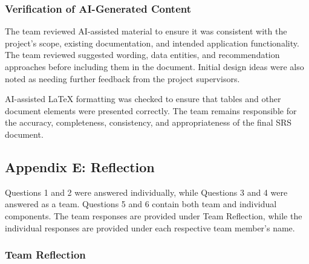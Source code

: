 \documentclass[12pt]{article}
\begin{document}
\subsubsection*{Verification of AI-Generated Content}

The team reviewed AI-assisted material to ensure it was
consistent with the project's scope, existing documentation,
and intended application functionality. The team reviewed suggested 
wording, data entities, and recommendation approaches before including 
them in the document. Initial design ideas were also noted as needing 
further feedback from the project supervisors.

AI-assisted \LaTeX{} formatting was checked to ensure
that tables and other document elements were presented
correctly. The team remains responsible for the accuracy,
completeness, consistency, and appropriateness of the
final SRS document.

\subsection{Appendix E: Reflection}

Questions 1 and 2 were answered individually, while Questions 3 and 4 were
answered as a team. Questions 5 and 6 contain both team and individual
components. The team responses are provided under Team Reflection, while the
individual responses are provided under each respective team member's name.

\subsubsection*{Team Reflection}
\end{document}
